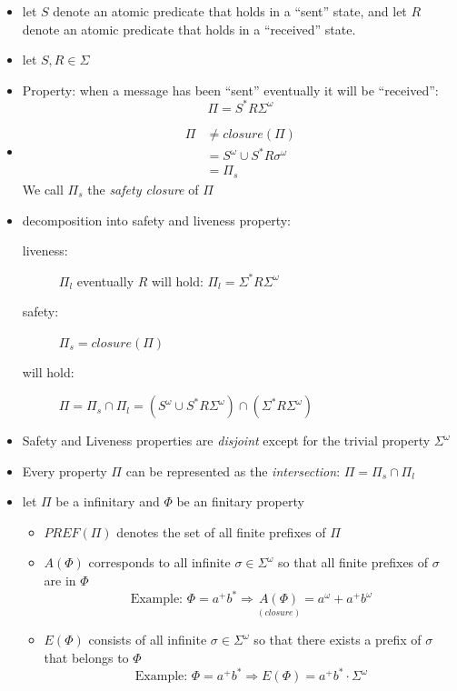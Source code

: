 \documentclass[a4paper, 10pt]{article}
\begin{document}
\begin{itemize}
    \item let $S$ denote an atomic predicate that holds in a ``sent'' state, and let $R$ denote an atomic predicate that holds in a ``received'' state.
    \item let $S,R\in \Sigma$
    \item Property: when a message has been ``sent'' eventually it will be ``received'': \[ \Pi=S^*R\Sigma^\omega \]
    \item \begin{align*}
    \Pi & \not= closure(\Pi) \\
    &= S^\omega\cup S^*R\sigma^\omega \\
    &= \Pi_s
    \end{align*}
    We call $\Pi_s$ the \emph{safety closure} of $\Pi$
    \item decomposition into safety and liveness property:
    \begin{description}
        \item[liveness:] $\Pi_l$ eventually $R$ will hold: $\Pi_l=\Sigma^* R\Sigma^\omega$
        \item[safety:] $\Pi_s = closure(\Pi)$
        \item[will hold:] $\Pi=\Pi_s\cap\Pi_l=(S^\omega\cup S^*R\Sigma^\omega)\cap(\Sigma^* R \Sigma^\omega)$
    \end{description}
    \item Safety and Liveness properties are \emph{disjoint} except for the trivial property $\Sigma^\omega$
    \item Every property $\Pi$ can be represented as the \emph{intersection}: $\Pi=\Pi_s\cap\Pi_l$
    \item let $\Pi$ be a infinitary and $\Phi$ be an finitary property
    \begin{itemize}
        \item $PREF(\Pi)$ denotes the set of all finite prefixes of $\Pi$
        \item $A(\Phi)$ corresponds to all infinite $\sigma\in\Sigma^\omega$ so that all finite prefixes of $\sigma$ are in $\Phi$ \[ \textrm{Example: } \Phi=a^+b^*\Rightarrow \underset{(closure)}{A(\Phi)}=a^\omega+a^+b^\omega \]
        \item $E(\Phi)$ consists of all infinite $\sigma\in\Sigma^\omega$ so that there exists a prefix of $\sigma$ that belongs to $\Phi$ \[ \textrm{Example: } \Phi=a^+b^*\Rightarrow E(\Phi)=a^+b^*\cdot \Sigma^\omega \] \\

\end{itemize}
\end{itemize}
\end{document}

